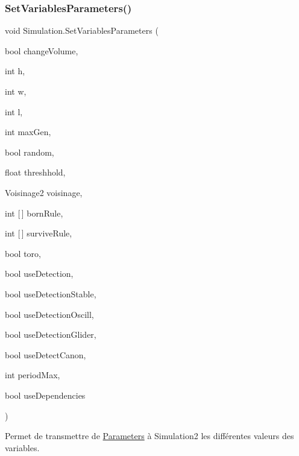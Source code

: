 \subsubsection{\texorpdfstring{Set\+Variables\+Parameters()}{SetVariablesParameters()}}
{\footnotesize\ttfamily void Simulation.\+Set\+Variables\+Parameters (\begin{DoxyParamCaption}\item[{bool}]{change\+Volume,  }\item[{int}]{h,  }\item[{int}]{w,  }\item[{int}]{l,  }\item[{int}]{max\+Gen,  }\item[{bool}]{random,  }\item[{float}]{threshhold,  }\item[{Voisinage2}]{voisinage,  }\item[{int \mbox{[}$\,$\mbox{]}}]{born\+Rule,  }\item[{int \mbox{[}$\,$\mbox{]}}]{survive\+Rule,  }\item[{bool}]{toro,  }\item[{bool}]{use\+Detection,  }\item[{bool}]{use\+Detection\+Stable,  }\item[{bool}]{use\+Detection\+Oscill,  }\item[{bool}]{use\+Detection\+Glider,  }\item[{bool}]{use\+Detect\+Canon,  }\item[{int}]{period\+Max,  }\item[{bool}]{use\+Dependencies }\end{DoxyParamCaption})\hspace{0.3cm}{\ttfamily [inline]}}



Permet de transmettre de \mbox{\hyperlink{class_parameters}{Parameters}} à Simulation2 les différentes valeurs des variables. 


